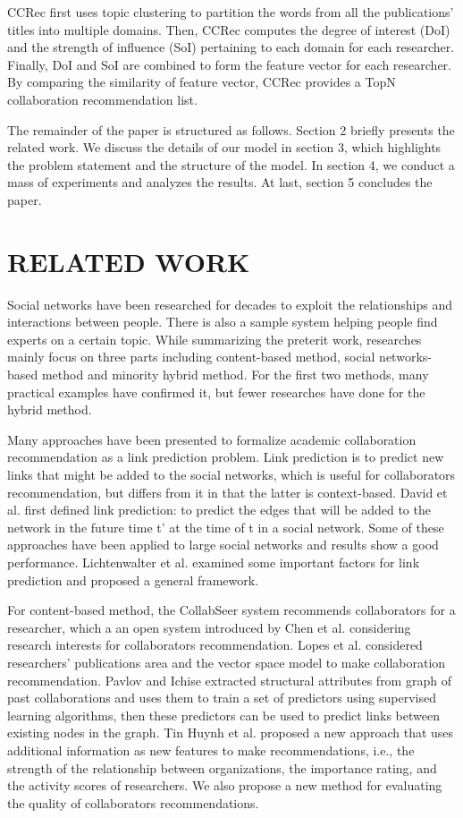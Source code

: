 \documentclass{acm_proc_article-sp}
\begin{document}
CCRec first uses topic clustering to partition the words from all the publications' titles into multiple domains. Then, CCRec computes the degree of interest (DoI) and the strength of influence (SoI) pertaining to each domain for each researcher. Finally, DoI and SoI are combined to form the feature vector for each researcher. By comparing the similarity of feature vector, CCRec provides a TopN collaboration recommendation list.

The remainder of the paper is structured as follows. Section 2 briefly presents the related work. We discuss the details of our model in section 3, which highlights the problem statement and the structure of the model. In section 4, we conduct a mass of experiments and analyzes the results. At last, section 5 concludes the paper.

\section{RELATED WORK}
Social networks have been researched for decades to exploit the relationships and interactions between people. There is also a sample system helping people find experts on a certain topic. While summarizing the preterit work, researches mainly focus on three parts including content-based method, social networks-based method and minority hybrid method. For the first two methods, many practical examples have confirmed it, but fewer researches have done for the hybrid method.

Many approaches have been presented to formalize academic collaboration recommendation as a link prediction problem. Link prediction is to predict new links that might be added to the social networks, which is useful for collaborators recommendation, but differs from it in that the latter is context-based. David et al. first defined link prediction: to predict the edges that will be added to the network in the future time t' at the time of t in a social network. Some of these approaches have been applied to large social networks and results show a good performance. Lichtenwalter et al. examined some important factors for link prediction and proposed a general framework.

For content-based method, the CollabSeer system recommends collaborators for a researcher, which a an open system introduced by Chen et al. considering research interests for collaborators recommendation. Lopes et al. considered researchers' publications area and the vector space model to make collaboration recommendation. Pavlov and Ichise extracted structural attributes from graph of past collaborations and uses them to train a set of predictors using supervised learning algorithms, then these predictors can be used to predict links between existing nodes in the graph. Tin Huynh et al. proposed a new approach that uses additional information as new features to make recommendations, i.e., the strength of the relationship between organizations, the importance rating, and the activity scores of researchers. We also propose a new method for evaluating the quality of collaborators recommendations.
\end{document}
